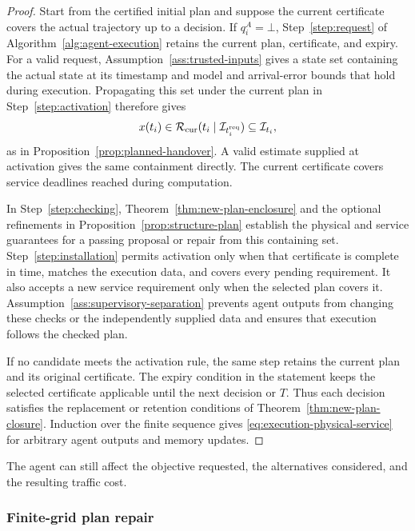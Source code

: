 \documentclass[preprint,12pt]{elsarticle}
\theoremstyle{definition}
\theoremstyle{plain}
\theoremstyle{definition}
\theoremstyle{plain}
\begin{document}
\begin{proof}
Start from the certified initial plan and suppose the current certificate
covers the actual trajectory up to a decision. If $q_i^A=\bot$,
Step~\ref{step:request} of Algorithm~\ref{alg:agent-execution} retains
the current plan, certificate, and expiry. For a valid request,
Assumption~\ref{ass:trusted-inputs} gives a state set containing the
actual state at its timestamp and model and arrival-error bounds that
hold during execution. Propagating this set under the current plan in
Step~\ref{step:activation} therefore gives
\[
x(t_i)\in
\mathcal R_{\rm cur}(t_i\mid\mathcal I_{t_i^{\rm req}})
\subseteq\mathcal I_{t_i},
\]
as in Proposition~\ref{prop:planned-handover}. A valid estimate supplied
at activation gives the same containment directly. The current
certificate covers service deadlines reached during computation.

In Step~\ref{step:checking}, Theorem~\ref{thm:new-plan-enclosure} and
the optional refinements in Proposition~\ref{prop:structure-plan}
establish the physical and service guarantees for a passing proposal or
repair from this containing set. Step~\ref{step:installation} permits
activation only when that certificate is complete in time, matches the
execution data, and covers every pending requirement. It also accepts a
new service requirement only when the selected plan covers it.
Assumption~\ref{ass:supervisory-separation} prevents agent outputs from
changing these checks or the independently supplied data and ensures
that execution follows the checked plan.

If no candidate meets the activation rule, the same step retains the
current plan and its original certificate. The expiry condition in the
statement keeps the selected certificate applicable until the next
decision or $T$. Thus each decision satisfies the replacement or
retention conditions of Theorem~\ref{thm:new-plan-closure}. Induction
over the finite sequence gives \eqref{eq:execution-physical-service}
for arbitrary agent outputs and memory updates.
\end{proof}

The agent can still affect the objective requested, the alternatives
considered, and the resulting traffic cost.

\subsubsection{Finite-grid plan repair}
\label{sec:predictive-repair}
\end{document}
